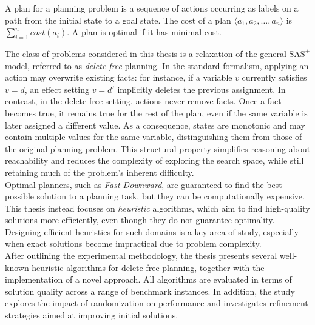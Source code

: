\begin{definition}[Plan]
	\label{def:plan}
	A plan for a planning problem is a sequence of actions occurring as labels on a path
	from the initial state to a goal state.
	The cost of a plan $\langle a_1, a_2, \dots, a_n \rangle$ is $\sum_{i = 1}^n cost(a_i)$.
	A plan is optimal if it has minimal cost.
\end{definition}

The class of problems considered in this thesis is a relaxation of the general $\text{SAS}^+$ model,
referred to as \textit{delete-free} planning.
In the standard formalism, applying an action may overwrite existing facts:
for instance, if a variable $v$ currently satisfies $v = d$, an effect setting $v = d'$
implicitly deletes the previous assignment.
In contrast, in the delete-free setting, actions never remove facts.
Once a fact becomes true, it remains true for the rest of the plan, even if the same variable
is later assigned a different value.
As a consequence, states are monotonic and may contain multiple values for the same variable,
distinguishing them from those of the original planning problem.
This structural property simplifies reasoning about reachability and reduces the complexity of
exploring the search space, while still retaining much of the problem's inherent difficulty.\\
Optimal planners, such as \textit{Fast Downward}, are guaranteed to find the best possible solution to a planning task, but they can be
computationally expensive. This thesis instead focuses on \textit{heuristic} algorithms, which aim to find high-quality solutions more efficiently,
even though they do not guarantee optimality.
Designing efficient heuristics for such domains is a key area of study, especially when exact solutions become impractical due to problem complexity.\\
After outlining the experimental methodology, the thesis presents several well-known heuristic algorithms for delete-free planning,
together with the implementation of a novel approach.
All algorithms are evaluated in terms of solution quality across a range of benchmark instances. In addition, the study explores the impact of
randomization on performance and investigates refinement strategies aimed at improving initial solutions.
